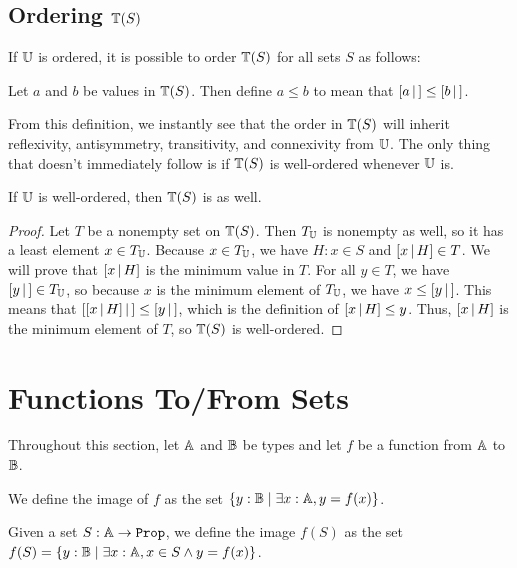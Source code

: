 \documentclass[../math.tex]{subfiles}
\begin{document}
\subsection{Ordering $\mathbb{T}(S)$}

If $\mathbb{U}$ is ordered, it is possible to order $\mathbb{T}(S)$ for all sets $S$ as follows:

\begin{definition}
    Let $a$ and $b$ be values in $\mathbb{T}(S)$.  Then define $a \leq b$ to mean that
    $[ a\, |\,] \leq [ b\, |\,]$.
\end{definition}

From this definition, we instantly see that the order in $\mathbb{T}(S)$ will inherit
reflexivity, antisymmetry, transitivity, and connexivity from $\mathbb{U}$.  The only
thing that doesn't immediately follow is if $\mathbb{T}(S)$ is well-ordered whenever
$\mathbb{U}$ is.

\begin{theorem}
    If $\mathbb{U}$ is well-ordered, then $\mathbb{T}(S)$ is as well.
\end{theorem}
\begin{proof}
    Let $T$ be a nonempty set on $\mathbb{T}(S)$.  Then $T_{\mathbb{U}}$ is nonempty as well, so
    it has a least element $x \in T_{\mathbb{U}}$.  Because $x \in T_{\mathbb{U}}$, we have $H : x
    \in S$ and $[ x \, | \, H ] \in T$.  We will prove that $[ x \, | \, H ]$ is the minimum
    value in $T$.  For all $y \in T$, we have $[ y\, |\,] \in T_{\mathbb{U}}$, so because $x$
    is the minimum element of $T_{\mathbb{U}}$, we have $x \leq [ y\, |\,]$.  This means that
    $[ [ x \, | \, H ]\, |\,] \leq [ y\, |\,]$, which is the definition of $[ x \, | \, H ] \leq
    y$.  Thus, $[ x \, | \, H ]$ is the minimum element of $T$, so $\mathbb{T}(S)$ is
    well-ordered.
\end{proof}

\section{Functions To/From Sets}

Throughout this section, let $\mathbb{A}$ and $\mathbb{B}$ be types and let $f$ be a function
from $\mathbb{A}$ to $\mathbb{B}$.

\begin{definition}
    We define the image of $f$ as the set $\{y : \mathbb{B} \mid \exists x : \mathbb{A}, y =
    f(x)\}$.
\end{definition}

\begin{definition}
    Given a set $S : \A \rightarrow \Prop$, we define the image $f(S)$ as the
    set $f(S) = \{y : \mathbb{B} \mid \exists x : \mathbb{A}, x \in S \wedge y = f(x)\}$.
\end{definition}
\end{document}
